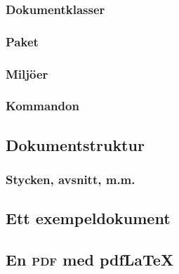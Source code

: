 \documentclass[11pt]{skrapport}
\newcommand\PDF{\textsc{pdf}}
\newcommand\pdfLaTeX{pdf\LaTeX}
\begin{document}
	\subsubsection{Dokumentklasser}
	
	\subsubsection{Paket}
	
	\subsubsection{Miljöer}
	
	\subsubsection{Kommandon}
	
	\subsection{Dokumentstruktur}
	
	\subsubsection{Stycken, avsnitt, m.m.}
	
	\subsection{Ett exempeldokument}
	
	\subsection{En \PDF{} med \pdfLaTeX}
	
\end{document}
